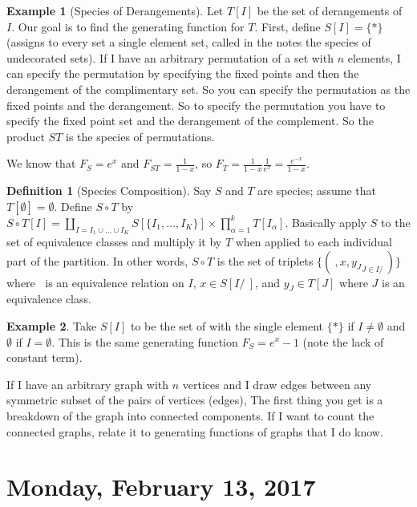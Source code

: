 \documentclass[12pt]{article}
\theoremstyle{definition}
\newtheorem{defn}{Definition}
\newtheorem{exmp}{Example}[section]
\begin{document}
\begin{exmp}[Species of Derangements]
    Let $T[I]$ be the set of derangements of $I$. Our goal is to find the
    generating function for $T$. First, define $S[I] = \{*\}$ (assigns to every
    set a single element set, called in the notes the species of undecorated
    sets). If I have an arbitrary permutation of a set with $n$ elements, I can
    specify the permutation by specifying the fixed points and then the
    derangement of the complimentary set. So you can specify the permutation as
    the fixed points and the derangement. So to specify the permutation you
    have to specify the fixed point set and the derangement of the complement.
    So the product $ST$ is the species of permutations.

    We know that $F_S = e^x$ and $F_{ST} = \frac{1}{1-x}$, so $F_T =
    \frac{1}{1-x}\frac{1}{e^x} = \frac{e^{-x}}{1-x}$.
\end{exmp}

\begin{defn}[Species Composition]
    Say $S$ and $T$ are species; assume that $T[\emptyset] = \emptyset$. Define
    $S \circ T$ by $S\circ T[I] = \coprod_{I = I_1 \cup \ldots \cup I_K}
    S[\{I_1, \ldots, I_K\}] \times \prod_{\alpha = 1}^k T[I_\alpha]$. Basically
    apply $S$ to the set of equivalence classes and multiply it by $T$ when
    applied to each individual part of the partition. In other words, $S \circ
    T$ is the set of triplets $\{(~, x, {y_J}_{J \in I/~})\}$
    where $~$ is an equivalence relation on $I$, $x \in S[I/~]$, and $y_J \in
    T[J]$ where $J$ is an equivalence class.
\end{defn}

\begin{exmp}
    Take $S[I]$ to be the set of with the single element $\{*\}$ if $I \ne
    \emptyset$ and $\emptyset$ if $I = \emptyset$. This is the same generating
    function $F_S = e^x - 1$ (note the lack of constant term).

    If I have an arbitrary graph with $n$ vertices and I draw edges between any
    symmetric subset of the pairs of vertices (edges), The first thing you get
    is a breakdown of the graph into connected components. If I want to count
    the connected graphs, relate it to generating functions of graphs that I do
    know.
\end{exmp}

\section{Monday, February 13, 2017}
\end{document}
